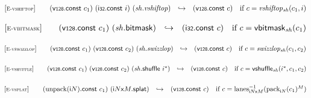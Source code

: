$$
\begin{array}[t]{@{}lrcl@{}l@{}}
{[\textsc{\scriptsize E{-}vshiftop}]} \quad & (\mathsf{v{\scriptstyle 128}}{.}\mathsf{const}~c_1)~(\mathsf{i{\scriptstyle 32}}{.}\mathsf{const}~i)~({\mathit{sh}} {.} {\mathit{vshiftop}}) & \hookrightarrow & (\mathsf{v{\scriptstyle 128}}{.}\mathsf{const}~c) & \quad \mbox{if}~ c = {{\mathit{vshiftop}}}{{}_{{\mathit{sh}}}}{(c_1, i)} \\
\end{array}
$$

\vspace{1ex}

$$
\begin{array}[t]{@{}lrcl@{}l@{}}
{[\textsc{\scriptsize E{-}vbitmask}]} \quad & (\mathsf{v{\scriptstyle 128}}{.}\mathsf{const}~c_1)~({\mathit{sh}}{.}\mathsf{bitmask}) & \hookrightarrow & (\mathsf{i{\scriptstyle 32}}{.}\mathsf{const}~c) & \quad \mbox{if}~ c = {\mathsf{vbitmask}}{{}_{{\mathit{sh}}}(c_1)} \\
\end{array}
$$

\vspace{1ex}

$$
\begin{array}[t]{@{}lrcl@{}l@{}}
{[\textsc{\scriptsize E{-}vswizzlop}]} \quad & (\mathsf{v{\scriptstyle 128}}{.}\mathsf{const}~c_1)~(\mathsf{v{\scriptstyle 128}}{.}\mathsf{const}~c_2)~({\mathit{sh}} {.} {\mathit{swizzlop}}) & \hookrightarrow & (\mathsf{v{\scriptstyle 128}}{.}\mathsf{const}~c) & \quad \mbox{if}~ c = {{\mathit{swizzlop}}}{{}_{{\mathit{sh}}}(c_1, c_2)} \\
\end{array}
$$

\vspace{1ex}

$$
\begin{array}[t]{@{}lrcl@{}l@{}}
{[\textsc{\scriptsize E{-}vshuffle}]} \quad & (\mathsf{v{\scriptstyle 128}}{.}\mathsf{const}~c_1)~(\mathsf{v{\scriptstyle 128}}{.}\mathsf{const}~c_2)~({\mathit{sh}}{.}\mathsf{shuffle}~{i^\ast}) & \hookrightarrow & (\mathsf{v{\scriptstyle 128}}{.}\mathsf{const}~c) & \quad \mbox{if}~ c = {\mathsf{vshuffle}}{{}_{{\mathit{sh}}}({i^\ast}, c_1, c_2)} \\
\end{array}
$$

\vspace{1ex}

$$
\begin{array}[t]{@{}lrcl@{}l@{}}
{[\textsc{\scriptsize E{-}vsplat}]} \quad & ({\mathrm{unpack}}({\mathsf{i}}{N}){.}\mathsf{const}~c_1)~({{\mathsf{i}}{N}}{\mathsf{x}}{M}{.}\mathsf{splat}) & \hookrightarrow & (\mathsf{v{\scriptstyle 128}}{.}\mathsf{const}~c) & \quad \mbox{if}~ c = {{{{\mathrm{lanes}}}_{{{\mathsf{i}}{N}}{\mathsf{x}}{M}}^{{-1}}}}{({{{\mathrm{pack}}}_{{\mathsf{i}}{N}}(c_1)^{M}})} \\
\end{array}
$$

